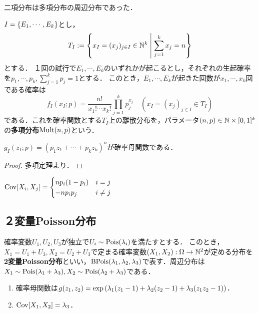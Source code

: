 \documentclass[uplatex,dvipdfmx]{jsreport}
\begin{document}
\begin{tcolorbox}[colframe=ForestGreen, colback=ForestGreen!10!white,breakable,colbacktitle=ForestGreen!40!white,coltitle=black,fonttitle=\bfseries\sffamily,
title=]
    二項分布は多項分布の周辺分布であった．
\end{tcolorbox}

\begin{definition}
    $I=\left\{E_1,\cdots,E_k\right\}$とし，
    \[T_I:=\left\{x_I=(x_j)_{j\in I}\in\mathbb{N}^k\;\middle|\;\sum^k_{j=1}x_j=n\right\}\]
    とする．
    １回の試行で$E_1,\cdots,E_k$のいずれかが起こるとし，それぞれの生起確率を$p_1,\cdots,p_k,\sum_{j=1}^kp_j=1$とする．
    このとき，$E_1,\cdots,E_k$が起きた回数が$x_1,\cdots,x_k$回である確率は
    \[f_I(x_I;p)=\frac{n!}{x_1!\cdots x_k!}\prod_{j=1}^kp_j^{x_j}\quad(x_I=(x_j)_{j\in I}\in T_I)\]
    である．これを確率関数とする$T_I$上の離散分布を，パラメータ$(n,p)\in\mathbb{N}\times[0,1]^k$の\textbf{多項分布}$\mathrm{Mult}(n,p)$という．
\end{definition}

\begin{proposition}
    $g_I(z_I;p)=(p_1z_1+\cdots+p_kz_k)^n$が確率母関数である．
\end{proposition}
\begin{proof}
    多項定理より．
\end{proof}

\begin{proposition}
    $\mathrm{Cov}[X_i,X_j]=\begin{cases}
        np_i(1-p_i)&i=j\\
        -np_ip_j&i\ne j
    \end{cases}$
\end{proposition}

\subsection{２変量Poisson分布}

\begin{definition}
    確率変数$U_1,U_2,U_3$が独立で$U_i\sim\mathrm{Pois}(\lambda_i)$を満たすとする．
    このとき，$X_1=U_1+U_3,X_2=U_2+U_3$で定まる確率変数$(X_1,X_2):\Omega\to\mathbb{N}^2$が定める分布を\textbf{2変量Poisson分布}といい，$\mathrm{BPois}(\lambda_1,\lambda_2,\lambda_3)$で表す．周辺分布は$X_1\sim\mathrm{Pois}(\lambda_1+\lambda_3),X_2\sim\mathrm{Pois}(\lambda_2+\lambda_3)$である．
\end{definition}

\begin{proposition}[分散や混合積率は確率母関数の項別微分で求める]\mbox{}
    \begin{enumerate}
        \item 確率母関数は$g(z_1,z_2)=\exp\left(\lambda_1(z_1-1)+\lambda_2(z_2-1)+\lambda_3(z_1z_2-1)\right)$．
        \item $\mathrm{Cov}[X_1,X_2]=\lambda_3$．
    \end{enumerate}
\end{proposition}
\end{document}

